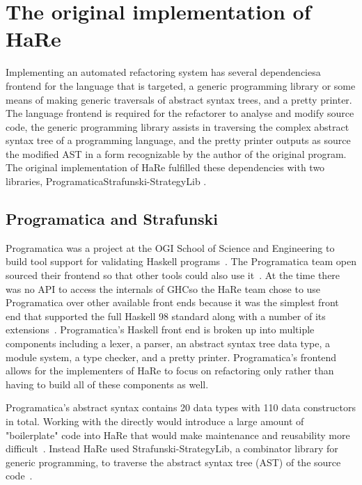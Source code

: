 \section{The original implementation of HaRe}
\label{hareOrig}

Implementing an automated refactoring system has several dependencies\DIFdelbegin {}\DIFdelend \DIFaddbegin {}\DIFaddend a frontend for the language that is targeted, a generic programming library or some means of making generic traversals of abstract syntax trees, and a pretty printer. The language frontend is required for the refactorer to analyse and modify source code, the generic programming library assists in traversing the complex abstract syntax tree of a \DIFdelbegin {}\DIFdelend \DIFaddbegin {}\DIFaddend programming language, and the pretty printer outputs as source the modified AST in a form recognizable by the author of the original program. The original implementation of HaRe fulfilled these dependencies with two libraries, Programatica\DIFdelbegin {}\DIFdelend \DIFaddbegin {}\DIFaddend Strafunski-StrategyLib \DIFaddbegin {}\DIFaddend . 

\subsection{Programatica and Strafunski}\label{prog&Strafunski}

Programatica was a project at the OGI School of Science and Engineering to build tool support for validating Haskell programs~\citep{programaticaTools}. The Programatica team open sourced their frontend so that other tools could also use it~\citep{refacWebsite}. At the time there was no API to access the internals of GHC\DIFaddbegin \DIFadd{, }\DIFaddend so the HaRe team chose to use Programatica over other available front ends because it was the simplest front end that supported the full Haskell 98 standard along with a number of its extensions~\citep{huiqingThesis}. Programatica's Haskell front end is broken up into multiple components including a lexer, a parser, an abstract syntax tree data type, a module system, a type checker, and a pretty printer. Programatica's frontend allows for the implementers of HaRe to focus on refactoring only rather than having to build all of these components as well.

Programatica's abstract syntax contains 20 data types with 110 data constructors in total. Working with the \DIFdelbegin {}\DIFdelend \DIFaddbegin {}\DIFaddend directly would introduce a large amount of "boilerplate" code into HaRe that would make maintenance and reusability \DIFdelbegin {}\DIFdelend more difficult~\citep{huiqingThesis}. Instead HaRe used Strafunski-StrategyLib, a combinator library for generic programming, to traverse the abstract syntax tree (AST) of the source code~\citep{strafunski}. 

